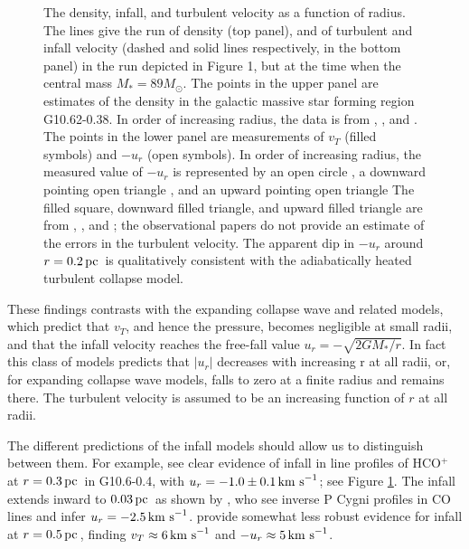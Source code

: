 \documentclass[iop,apj,numberedappendix]{emulateapj}
\newcommand       \pc		{\,{\rm pc \,}}
\newcommand       \kms          {\,{\rm km \,\, s}^{-1}}
\begin{document}
\begin{figure}
\caption{\label{fig_rho_v_data} The density, infall, and turbulent
  velocity as a function of radius. The lines give the run of density
  (top panel), and of turbulent and infall velocity (dashed and solid
  lines respectively, in the bottom panel) in the run depicted in
  Figure 1, but at the time when the central mass $M_*=89M_\odot$. The
  points in the upper panel are estimates of the density in the
  galactic massive star forming region G10.62-0.38. In order of
  increasing radius, the data is from \citet{2011A&A...525A.151B},
  \citet{2008ApJ...684.1273K}, and \citet{1986ApJ...304..501H}. The
  points in the lower panel are measurements of $v_T$ (filled symbols)
  and $-u_r$ (open symbols). In order of increasing radius, the
  measured value of $-u_r$ is represented by an open circle
  \citep{2011A&A...530A..53K}, a downward pointing open triangle
  \citep{2008ApJ...684.1273K}, and an upward pointing open triangle
  \citep{1986ApJ...304..501H} The filled square, downward filled
  triangle, and upward filled triangle are from
  \citet{2011A&A...525A.151B}, \citet{2008ApJ...684.1273K}, and
  \citet{1986ApJ...304..501H}; the observational papers do not provide
  an estimate of the errors in the turbulent velocity. The apparent
  dip in $-u_r$ around $r=0.2\pc$ is qualitatively
  consistent with the adiabatically heated turbulent collapse model.}
\end{figure}

These findings contrasts with the expanding collapse wave and related
models, which predict that $v_T$, and hence the pressure, becomes
negligible at small radii, and that the infall velocity reaches the
free-fall value $u_r=-\sqrt{2GM_*/r}$. In fact this class of
models predicts that $|u_r|$ decreases with increasing r at all radii,
or, for expanding collapse wave models, falls to zero at a finite
radius and remains there.  The turbulent velocity is
assumed to be an increasing function of $r$ at all radii.

The different predictions of the infall models should allow us to
distinguish between them. For example, \citet{2008ApJ...684.1273K} see
clear evidence of infall in line profiles of HCO$^+$ at $r=0.3\pc$ in
G10.6-0.4, with $u_r=-1.0\pm0.1\kms$; see Figure
\ref{fig_rho_v_data}. The infall extends inward to $0.03\pc$ as shown
by \citet{2011A&A...530A..53K}, who see inverse P Cygni profiles in CO
lines and infer $u_r=-2.5\kms$. \citet{1986ApJ...304..501H} provide
somewhat less robust evidence for infall at $r=0.5\pc$, finding
$v_T\approx6\kms$ and $-u_r\approx 5\kms$.
\end{document}
